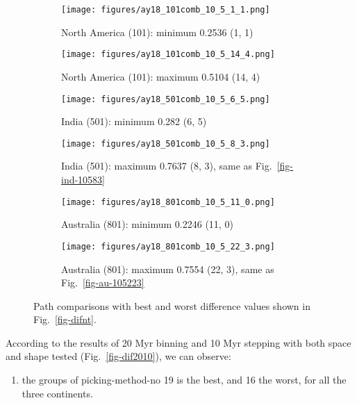 \begin{figure*}
	\centering
	\begin{subfigure}{.42\textwidth}
		\texttt{[image: figures/ay18\_101comb\_10\_5\_1\_1.png]}
		\caption{North America (101): minimum 0.2536 (1, 1)}\label{fig-nant-10511}
	\end{subfigure}
	\begin{subfigure}{.42\textwidth}
		\texttt{[image: figures/ay18\_101comb\_10\_5\_14\_4.png]}
		\caption{North America (101): maximum 0.5104 (14, 4)}\label{fig-nant-105144}
	\end{subfigure}
	\vspace{.1em}
	\begin{subfigure}{.42\textwidth}
		\texttt{[image: figures/ay18\_501comb\_10\_5\_6\_5.png]}
		\caption{India (501): minimum 0.282 (6, 5)}\label{fig-indnt-10565}
	\end{subfigure}
	\begin{subfigure}{.42\textwidth}
		\texttt{[image: figures/ay18\_501comb\_10\_5\_8\_3.png]}
		\caption{India (501): maximum 0.7637 (8, 3), same as Fig.~\ref{fig-ind-10583}}\label{fig-indnt-10583}
	\end{subfigure}
	\vspace{.1em}
	\begin{subfigure}{.42\textwidth}
		\texttt{[image: figures/ay18\_801comb\_10\_5\_11\_0.png]}
		\caption{Australia (801): minimum 0.2246 (11, 0)}\label{fig-aunt-105110}
	\end{subfigure}
	\begin{subfigure}{.42\textwidth}
		\texttt{[image: figures/ay18\_801comb\_10\_5\_22\_3.png]}
		\caption{Australia (801): maximum 0.7554 (22, 3), same as Fig.~\ref{fig-au-105223}}\label{fig-aunt-105223}
	\end{subfigure}
	\caption[Best and worst differences without shape test (10 Myr bin, 5 Myr
step)]{Path comparisons with best and worst difference values shown in
Fig.~\ref{fig-difnt}.}\label{fig-difntbw}
\end{figure*}

According to the results of 20 Myr binning and 10 Myr stepping with both space
and shape tested (Fig.~\ref{fig-dif2010}), we can observe:

\begin{enumerate}
  \item the groups of picking-method-no 19 is the best, and 16 the worst, for
        all the three continents.
\end{enumerate}


